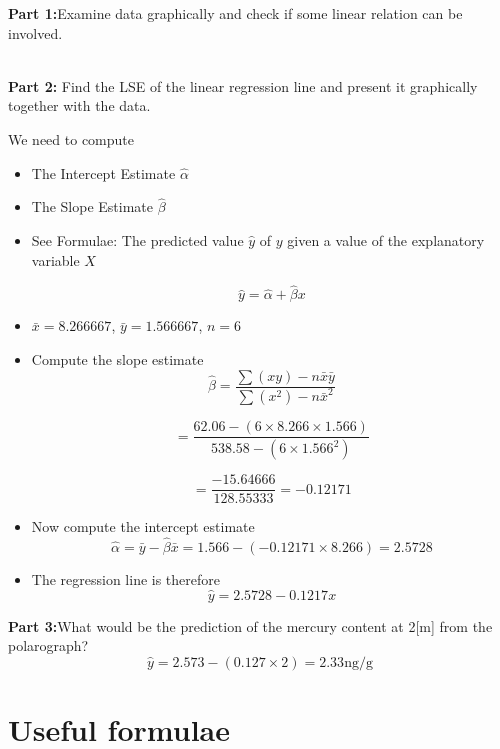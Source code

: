 


\noindent\textbf{Part 1:}Examine data graphically and check if some linear relation can be involved.

\\
\bigskip
\noindent\textbf{Part 2: }Find the LSE of the linear regression line and present it graphically together with the data.

We need to compute

\begin{itemize}
	
	\item The Intercept Estimate $\hat{\alpha}$
	
	\item The Slope Estimate $\hat{\beta}$
	
	\item See Formulae: The predicted value $\hat{y} $ of $y$ given a value of the explanatory variable $X$
	
	\[\hat{y} = \hat{\alpha} + \hat{\beta}x \]
	
	
	
	\item  $\bar{x} = 8.266667$, $\bar{y} = 1.566667$, $n =6$
	
	\item Compute the slope estimate
	\[\hat{\beta} =  \frac{\sum(xy) - n\bar{x} \bar{y} }{\sum(x^2) - n\bar{x}^2 }\]
	
	\[= \frac{62.06 - (6 \times 8.266 \times 1.566) }{538.58  - (6 \times 1.566^2) }\]
	
	\[= \frac{-15.64666}{128.55333} = -0.12171\]
	
	
	\item Now compute the intercept estimate \[ \hat{\alpha} = \bar{y} - \hat{\beta}\bar{x} = 1.566-(-0.12171 \times 8.266) = 2.5728\]
	\item The regression line is therefore \[\hat{y} = 2.5728 - 0.1217x \]
\end{itemize}




\noindent\textbf{Part 3:}What would be the prediction of the mercury content at 2[m] from the polarograph?
\bigskip
\[ \hat{y} = 2.573 - (0.127 \times 2) = 2.33 \mbox{ng/g}  \]








\section{Useful formulae}

